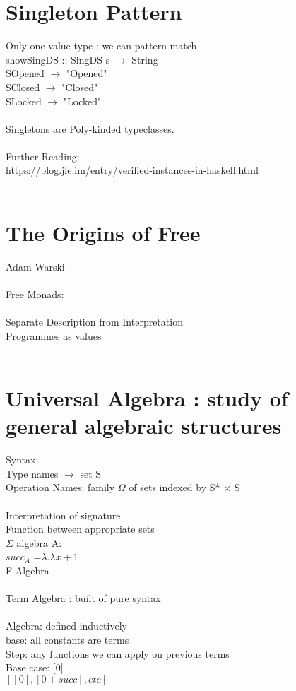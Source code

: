 \documentclass{article}
\begin{document}
\section{Singleton Pattern}
Only one value type : we can pattern match
\\
showSingDS :: SingDS s $\rightarrow$ String 
\\
   SOpened $\rightarrow$ "Opened"
\\
   SClosed $\rightarrow$ "Closed"
\\
   SLocked $\rightarrow$ "Locked"
\\
\\
Singletons are Poly-kinded typeclasses.
\\
\\
Further Reading: 
\\
https://blog.jle.im/entry/verified-instances-in-haskell.html
\\
\\
\section{The Origins of Free}
Adam Warski
\\
\\
Free Monads:
\\
\\
Separate Description from Interpretation
\\
Programmes as values
\\
\\
\section{Universal Algebra : study of general algebraic structures}
Syntax:
\\
Type names $\rightarrow$ set S
\\
Operation Names: family $\Omega$ of sets indexed by S* $\times$ S
\\
\\
Interpretation of signature 
\\
Function between appropriate sets
\\
$\Sigma$ algebra A:
\\
$succ_{A}$ =$\lambda . \lambda x + 1$
\\
F-Algebra
\\
\\
Term Algebra : built of pure syntax
\\
\\
Algebra: defined inductively
\\
base: all constants are terms
\\
Step: any functions we can apply on previous terms
\\
Base case: [0]
\\
$[[0], [0 + succ], etc]$
\\
\\
\end{document}
